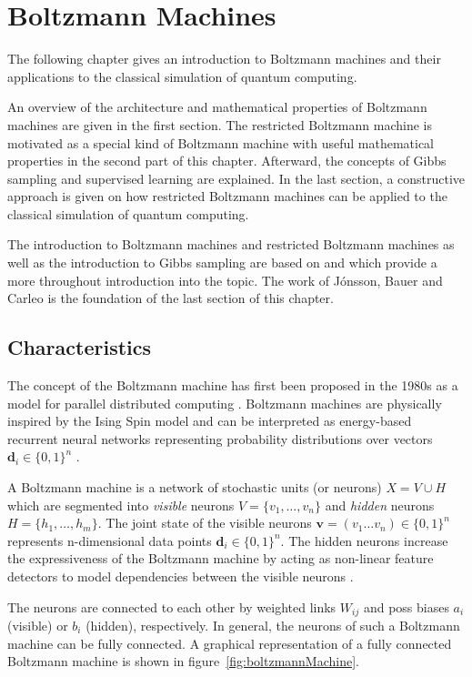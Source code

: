 \chapter{Boltzmann Machines}
\label{sec:rbm}
The following chapter gives an introduction to Boltzmann machines and their applications to the classical 
simulation of quantum computing.

An overview of the architecture and mathematical properties of Boltzmann machines are given in the first section. The restricted Boltzmann machine is motivated as a special kind of Boltzmann machine with useful mathematical properties in the second part of this chapter. Afterward, the concepts of Gibbs sampling and supervised learning are explained.
In the last section, a constructive approach is given on how restricted Boltzmann machines 
can be applied to the classical simulation of quantum computing.

The introduction to Boltzmann machines and restricted Boltzmann machines as well as the introduction 
to Gibbs sampling are based on \cite{montufar2018restricted} and 
\cite{fischer2012introduction} which provide a more throughout introduction 
into the topic. The work of J\'{o}nsson, Bauer and Carleo \cite{jnsson2018neuralnetwork} is the 
foundation of the last section of this chapter.

\section{Characteristics}
\label{sec:gbm}
The concept of the Boltzmann machine has first been proposed in the 1980s as a
model for parallel distributed computing \cite{hinton1983analyzing}. Boltzmann machines are physically inspired by the Ising Spin model and can be interpreted as energy-based recurrent neural networks representing probability distributions
over vectors $\bm{d}_i \in \{0,1\}^n$ \cite{ackley1985learning}.

A Boltzmann machine is a network of stochastic units (or neurons) $X=V \cup H$ which are segmented into
\textit{visible} neurons $V=\{v_1, \dots, v_n\}$ and \textit{hidden} neurons $H=\{h_1, \dots, h_m\}$.
The joint state of the visible neurons $\bm{v} = (v_1\dots v_n) \in \{0,1\}^n$ represents n-dimensional data
points $\bm{d}_i \in \{0,1\}^n$. The hidden neurons increase the expressiveness of the Boltzmann machine by acting as non-linear feature 
detectors to model dependencies between the visible neurons \cite{hinton2010boltzmann}.

The neurons are 
connected to each other by weighted links $W_{ij}$ and poss biases $a_i$ (visible) or $b_i$ (hidden), respectively. In 
general, the neurons of such a Boltzmann machine can be fully connected. A graphical representation of a fully connected Boltzmann machine is shown in figure~\ref{fig:boltzmannMachine}.


